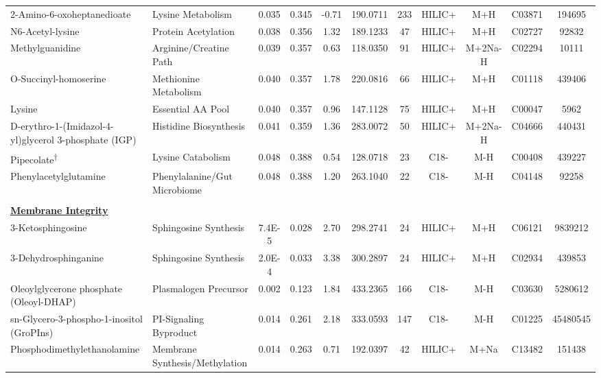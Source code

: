 \begin{longtable}[t]{llccccccccc}
\hspace*{0.3cm}2-Amino-6-oxoheptanedioate & Lysine Metabolism & 0.035 & 0.345 & -0.71 & 190.0711 & 233 & HILIC+ & M+H & C03871 & 194695\\
\hspace*{0.3cm}N6-Acetyl-lysine & Protein Acetylation & 0.038 & 0.356 & 1.32 & 189.1233 & 47 & HILIC+ & M+H & C02727 & 92832\\
\hspace*{0.3cm}Methylguanidine & Arginine/Creatine Path & 0.039 & 0.357 & 0.63 & 118.0350 & 91 & HILIC+ & M+2Na-H & C02294 & 10111\\
\hspace*{0.3cm}O-Succinyl-homoserine & Methionine Metabolism & 0.040 & 0.357 & 1.78 & 220.0816 & 66 & HILIC+ & M+H & C01118 & 439406\\
\hspace*{0.3cm}Lysine & Essential AA Pool & 0.040 & 0.357 & 0.96 & 147.1128 & 75 & HILIC+ & M+H & C00047 & 5962\\

\hspace*{0.3cm}D-erythro-1-(Imidazol-4-yl)glycerol 3-phosphate (IGP) & Histidine Biosynthesis & 0.041 & 0.359 & 1.36 & 283.0072 & 50 & HILIC+ & M+2Na-H & C04666 & 440431\\
\hspace*{0.3cm}Pipecolate\textsuperscript{†} & Lysine Catabolism & 0.048 & 0.388 & 0.54 & 128.0718 & 23 & C18- & M-H & C00408 & 439227\\
\hspace*{0.3cm}Phenylacetylglutamine & Phenylalanine/Gut Microbiome & 0.048 & 0.388 & 1.20 & 263.1040 & 22 & C18- & M-H & C04148 & 92258\\
 &  &  &  &  &  &  &  &  &  & \\
\fontsize{9pt}{10.8pt}\selectfont\textbf{\underline{Membrane Integrity}} &  &  &  &  &  &  &  &  &  & \\

\hspace*{0.3cm}3-Ketosphingosine & Sphingosine Synthesis & 7.4E-5 & 0.028 & 2.70 & 298.2741 & 24 & HILIC+ & M+H & C06121 & 9839212\\
\hspace*{0.3cm}3-Dehydrosphinganine & Sphingosine Synthesis & 2.0E-4 & 0.033 & 3.38 & 300.2897 & 24 & HILIC+ & M+H & C02934 & 439853\\
\hspace*{0.3cm}Oleoylglycerone phosphate (Oleoyl-DHAP) & Plasmalogen Precursor & 0.002 & 0.123 & 1.84 & 433.2365 & 166 & C18- & M-H & C03630 & 5280612\\
\hspace*{0.3cm}sn-Glycero-3-phospho-1-inositol (GroPIns) & PI-Signaling Byproduct & 0.014 & 0.261 & 2.18 & 333.0593 & 147 & C18- & M-H & C01225 & 45480545\\
\hspace*{0.3cm}Phosphodimethylethanolamine & Membrane Synthesis/Methylation & 0.014 & 0.263 & 0.71 & 192.0397 & 42 & HILIC+ & M+Na & C13482 & 151438\\


\end{longtable}

